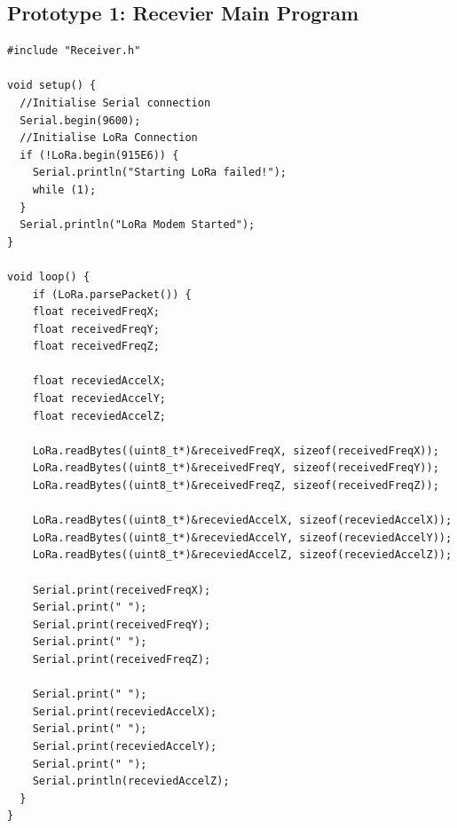 \subsection{Prototype 1: Recevier Main Program}
\begin{verbatim}
#include "Receiver.h"

void setup() {
  //Initialise Serial connection
  Serial.begin(9600);
  //Initialise LoRa Connection
  if (!LoRa.begin(915E6)) {
    Serial.println("Starting LoRa failed!");
    while (1);
  }
  Serial.println("LoRa Modem Started");
}

void loop() {
    if (LoRa.parsePacket()) {
    float receivedFreqX;
    float receivedFreqY;
    float receivedFreqZ;

    float receviedAccelX;
    float receviedAccelY;
    float receviedAccelZ;

    LoRa.readBytes((uint8_t*)&receivedFreqX, sizeof(receivedFreqX));
    LoRa.readBytes((uint8_t*)&receivedFreqY, sizeof(receivedFreqY));
    LoRa.readBytes((uint8_t*)&receivedFreqZ, sizeof(receivedFreqZ));

    LoRa.readBytes((uint8_t*)&receviedAccelX, sizeof(receviedAccelX));
    LoRa.readBytes((uint8_t*)&receviedAccelY, sizeof(receviedAccelY));
    LoRa.readBytes((uint8_t*)&receviedAccelZ, sizeof(receviedAccelZ));

    Serial.print(receivedFreqX); 
    Serial.print(" ");
    Serial.print(receivedFreqY);
    Serial.print(" ");
    Serial.print(receivedFreqZ);       

    Serial.print(" ");
    Serial.print(receviedAccelX); 
    Serial.print(" ");
    Serial.print(receviedAccelY);
    Serial.print(" ");
    Serial.println(receviedAccelZ);
  }
}
\end{verbatim}


